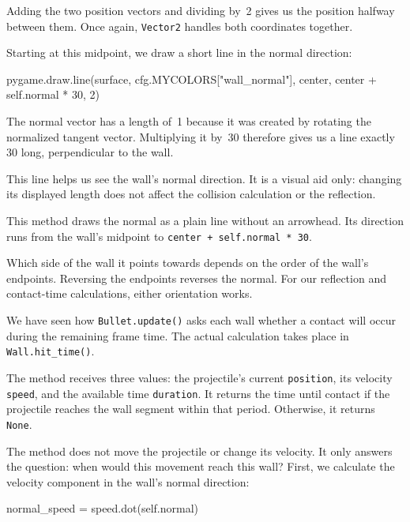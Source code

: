 Adding the two position vectors and dividing by~2 gives us the position halfway between them. Once again, \texttt{Vector2} handles both coordinates together.

Starting at this midpoint, we draw a short line in the normal direction:
\begin{codebox}
pygame.draw.line(surface, cfg.MYCOLORS["wall_normal"], 
                 center, center + self.normal * 30, 2)
\end{codebox}

The normal vector has a length of~1 because it was created by rotating the normalized tangent vector. Multiplying it by~30 therefore gives us a line exactly \SI{30}{\pixel} long, perpendicular to the wall.

This line helps us see the wall's normal direction. It is a visual aid only: changing its displayed length does not affect the collision calculation or the reflection.

\begin{hintbox}
	This method draws the normal as a plain line without an arrowhead. Its direction runs from the wall's midpoint to \texttt{center + self.normal * 30}.
	
	Which side of the wall it points towards depends on the order of the wall's endpoints. Reversing the endpoints reverses the normal. For our reflection and contact-time calculations, either orientation works.
\end{hintbox}


We have seen how \texttt{Bullet.update()} asks each wall whether a contact will occur during the remaining frame time. The actual calculation takes place in \texttt{Wall.hit\_time()}.

The method receives three values: the projectile's current \texttt{position}, its velocity \texttt{speed}, and the available time \texttt{duration}. It returns the time until contact if the projectile reaches the wall segment within that period. Otherwise, it returns \texttt{None}.

The method does not move the projectile or change its velocity. It only answers the question: when would this movement reach this wall? First, we calculate the velocity component in the wall's normal direction:
\begin{codebox}
	normal_speed = speed.dot(self.normal)
\end{codebox}

